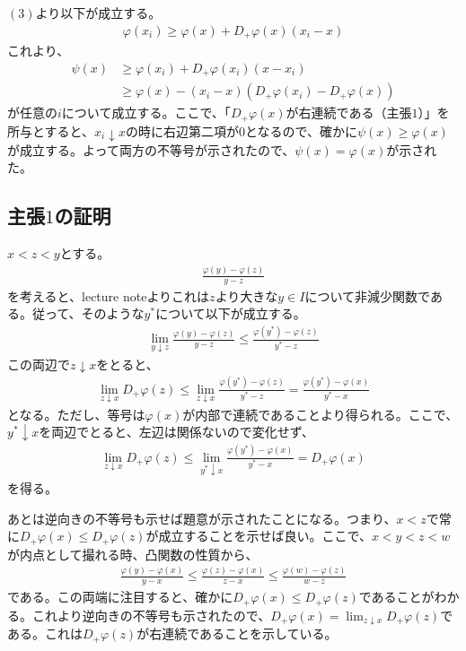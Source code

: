 \documentclass{article}
\begin{document}
$(3)$より以下が成立する。
\begin{align*}
	\varphi(x_i) \geq \varphi(x) + D_{+}\varphi(x) (x_i - x)
\end{align*}
これより、
\begin{align*}
	\psi(x) &\geq \varphi(x_i) + D_{+}\varphi(x_i) (x - x_i)\\
	&\geq \varphi(x) - (x_i - x) (D_{+}\varphi(x_i) - D_{+}\varphi(x))
\end{align*}
が任意の$i$について成立する。ここで、「$D_{+} \varphi(x)$が右連続である（主張$1$）」を所与とすると、$x_i \downarrow x$の時に右辺第二項が$0$となるので、確かに$\psi(x) \geq \varphi(x)$が成立する。よって両方の不等号が示されたので、$\psi(x) =  \varphi(x)$が示された。

\subsection{主張$1$の証明}
$x < z < y$とする。
\begin{align*}
	\frac{\varphi(y) - \varphi(z)}{y-z}
\end{align*}
を考えると、lecture noteよりこれは$z$より大きな$y \in I$について非減少関数である。従って、そのような$y^{*}$について以下が成立する。
\begin{align*}
	\lim_{y\downarrow z} \frac{\varphi(y) -\varphi(z)}{y-z} \leq \frac{\varphi(y^{*})- \varphi(z)}{y^{*}-z}
\end{align*}
この両辺で$z\downarrow x$をとると、
\begin{align*}
	\lim_{z\downarrow x} D_{+}\varphi(z) \leq \lim_{z\downarrow x} \frac{\varphi(y^{*})- \varphi(z)}{y^{*}-z} = \frac{\varphi(y^{*})- \varphi(x)}{y^{*}-x}
\end{align*}
となる。ただし、等号は$\varphi(x)$が内部で連続であることより得られる。ここで、$y^{*} \downarrow x$を両辺でとると、左辺は関係ないので変化せず、
\begin{align*}
	\lim_{z\downarrow x} D_{+}\varphi(z) \leq \lim_{y^{*} \downarrow x} \frac{\varphi(y^{*})- \varphi(x)}{y^{*}-x} = D_{+}\varphi(x)
\end{align*}
を得る。

あとは逆向きの不等号も示せば題意が示されたことになる。つまり、$x < z$で常に$D_{+}\varphi(x) \leq D_{+}\varphi(z)$が成立することを示せば良い。ここで、$x < y < z < w$が内点として撮れる時、凸関数の性質から、
\begin{align*}
	\frac{\varphi(y) - \varphi(x)}{y-x} \leq \frac{\varphi(z) - \varphi(x)}{z-x} \leq \frac{\varphi(w) - \varphi(z)}{w-z}
\end{align*}
である。この両端に注目すると、確かに$D_{+}\varphi(x) \leq D_{+}\varphi(z)$であることがわかる。これより逆向きの不等号も示されたので、$D_{+}\varphi(x) = \lim_{z\downarrow x} D_{+}\varphi(z)$である。これは$D_{+}\varphi(z)$が右連続であることを示している。
\end{document}
